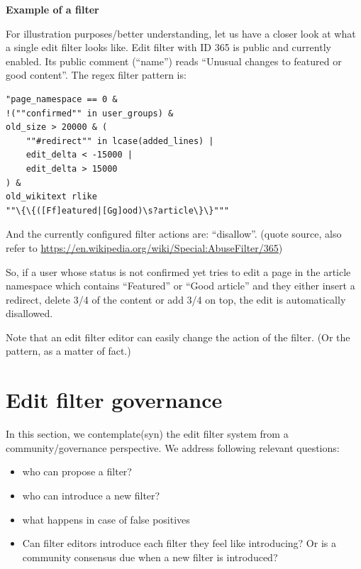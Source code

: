 \documentclass{sigchi}
\begin{document}

\textbf{Example of a filter}

For illustration purposes/better understanding, let us have a closer look at what a single edit filter looks like.
Edit filter with ID 365 is public and currently enabled.
Its public comment (``name'') reads ``Unusual changes to featured or good content''.
The regex filter pattern is:
\begin{verbatim}
"page_namespace == 0 &
!(""confirmed"" in user_groups) &
old_size > 20000 & (
    ""#redirect"" in lcase(added_lines) |
    edit_delta < -15000 |
    edit_delta > 15000
) &
old_wikitext rlike
""\{\{([Ff]eatured|[Gg]ood)\s?article\}\}"""
\end{verbatim}
And the currently configured filter actions are: ``disallow''.
(quote source, also refer to \url{https://en.wikipedia.org/wiki/Special:AbuseFilter/365})

So, if a user whose status is not confirmed yet tries to edit a page in the article namespace which contains ``Featured'' or ``Good article'' and they either insert a redirect, delete 3/4 of the content or add 3/4 on top, the edit is automatically disallowed.

Note that an edit filter editor can easily change the action of the filter. (Or the pattern, as a matter of fact.)


\section{Edit filter governance}

In this section, we contemplate(syn) the edit filter system from a community/governance perspective.
We address following relevant questions:

\begin{itemize}
    \item who can propose a filter?
    \item who can introduce a new filter?
    \item what happens in case of false positives
    \item Can filter editors introduce each filter they feel like introducing? Or is a community consensus due when a new filter is introduced?
\end{itemize}
\end{document}
